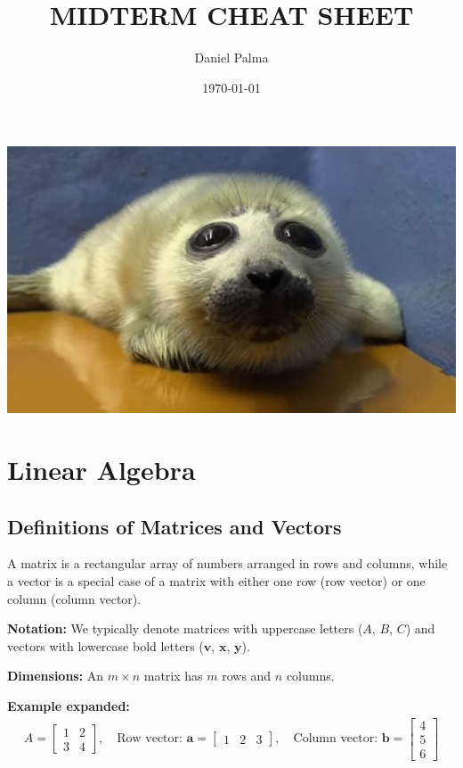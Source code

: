 \documentclass{article}
\title{MIDTERM CHEAT SHEET}
\author{Daniel Palma}
\date{\today}
\begin{document}
\maketitle

\includegraphics[width=\textwidth]{niko.jpg}

\section{Linear Algebra}

\subsection{Definitions of Matrices and Vectors}
A matrix is a rectangular array of numbers arranged in rows and columns, while a vector is a special case of a matrix with either one row (row vector) or one column (column vector).

\textbf{Notation:} We typically denote matrices with uppercase letters ($A$, $B$, $C$) and vectors with lowercase bold letters ($\mathbf{v}$, $\mathbf{x}$, $\mathbf{y}$).

\textbf{Dimensions:} An $m \times n$ matrix has $m$ rows and $n$ columns.

\textbf{Example expanded:}
\begin{align}
A = \begin{bmatrix} 
1 & 2 \\
3 & 4
\end{bmatrix}, \quad 
\text{Row vector: } \mathbf{a} = \begin{bmatrix} 1 & 2 & 3 \end{bmatrix}, \quad
\text{Column vector: } \mathbf{b} = \begin{bmatrix} 4 \\ 5 \\ 6 \end{bmatrix}
\end{align}
\end{document}

